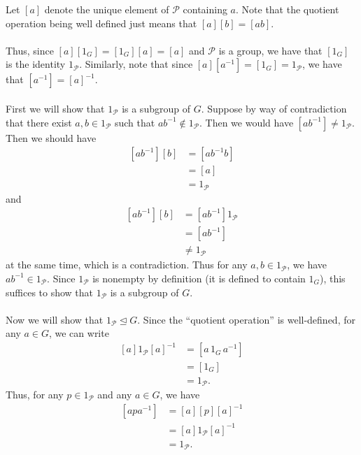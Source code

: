 \documentclass[12 pt, letterpaper]{hmcpset}
\begin{document}
\begin{solution}
	Let $[a]$ denote the unique element of $\mathcal{P}$ containing $a$. Note that the quotient operation being well defined just means that $[a][b] = [ab]$. \\\\
	Thus, since $[a][1_{G}] = [1_{G}][a] = [a]$ and $\mathcal{P}$ is a group, we have that $[1_{G}]$ is the identity $1_{\mathcal{P}}$. Similarly, note that since $[a][a^{-1}] = [1_{G}] = 1_{\mathcal{P}}$, we have that $[a^{-1}] = [a]^{-1}$. \\\\
	First we will show that $1_{\mathcal{P}}$ is a subgroup of $G$. Suppose by way of contradiction that there exist $a, b \in 1_{\mathcal{P}}$ such that $ab^{-1} \notin 1_{\mathcal{P}}$. Then we would have $[ab^{-1}] \neq 1_{\mathcal{P}}$. Then we should have
	\[
		\begin{split}
			[ab^{-1}][b] & = [ab^{-1}b] \\
				     & = [a] \\
				     & = 1_{\mathcal{P}}
		\end{split}
	\]
	and 
	\[
		\begin{split}
			[ab^{-1}][b] & = [ab^{-1}] 1_{\mathcal{P}} \\
				     & = [ab^{-1}] \\
				     & \neq 1_{\mathcal{P}}
		\end{split}
	\]
	at the same time, which is a contradiction. Thus for any $a, b \in 1_{\mathcal{P}}$, we have $ab^{-1} \in 1_{\mathcal{P}}$. Since $1_{\mathcal{P}}$ is nonempty by definition (it is defined to contain $1_{G}$), this suffices to show that $1_{\mathcal{P}}$ is a subgroup of $G$. \\\\
	Now we will show that $1_{\mathcal{P}} \trianglelefteq G$. Since the ``quotient operation'' is well-defined, for any $a \in G$, we can write
	\[
		\begin{split}
			[a] 1_{\mathcal{P}} [a]^{-1} & = [a \, 1_{G} \, a^{-1}] \\
					   & = [1_{G}] \\
					   & = 1_{\mathcal{P}}.
		\end{split}
	\]
	Thus, for any $p \in 1_{\mathcal{P}}$ and any $a \in G$, we have
	\[
		\begin{split}
			[apa^{-1}] & = [a][p][a]^{-1} \\ 
			   & = [a] 1_{\mathcal{P}} [a]^{-1} \\
			   & = 1_{\mathcal{P}}.

\end{split}\]
\end{solution}
\end{document}
